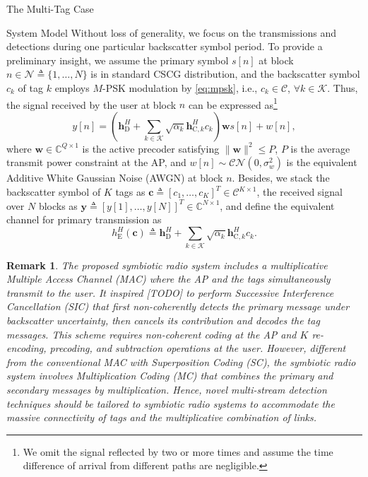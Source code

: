 \documentclass[journal]{IEEEtran}
\newtheorem{remark}{Remark}
\begin{document}
\begin{section}{The Multi-Tag Case}
\begin{subsection}{System Model}
			Without loss of generality, we focus on the transmissions and detections during one particular backscatter symbol period. To provide a preliminary insight, we assume the primary symbol $s[n]$ at block $n \in \mathcal{N} \triangleq \{1,\ldots,N\}$ is in standard CSCG distribution, and the backscatter symbol $c_k$ of tag $k$ employs $M$-PSK modulation by \eqref{eq:mpsk}, i.e., $c_k \in \mathcal{C}$, $\forall k \in \mathcal{K}$. Thus, the signal received by the user at block $n$ can be expressed as\footnote{We omit the signal reflected by two or more times\cite{Wu2019} and assume the time difference of arrival from different paths are negligible\cite{Guo2019b}.}
			\begin{equation}
				y[n] = \left(\boldsymbol{h}_{\mathrm{D}}^H + \sum_{k \in \mathcal{K}} \sqrt{\alpha_k} \boldsymbol{h}_{\mathrm{C},k}^H c_k\right) \boldsymbol{w} s[n] + w[n],
				\label{eq:received_signal}
			\end{equation}
			where $\boldsymbol{w} \in \mathbb{C}^{Q \times 1}$ is the active precoder satisfying $\lVert \boldsymbol{w} \rVert^2 \le P$, $P$ is the average transmit power constraint at the AP, and $w[n] \sim \mathcal{CN}(0,\sigma_w^2)$ is the equivalent Additive White Gaussian Noise (AWGN) at block $n$. Besides, we stack the backscatter symbol of $K$ tags as $\boldsymbol{c} \triangleq [c_1,\ldots,c_K]^T \in \mathcal{C}^{K \times 1}$, the received signal over $N$ blocks as $\boldsymbol{y} \triangleq \left[y[1],\ldots,y[N]\right]^T \in \mathbb{C}^{N \times 1}$, and define the equivalent channel for primary transmission as
			\begin{equation}
				h_{\mathrm{E}}^H(\boldsymbol{c}) \triangleq \boldsymbol{h}_{\mathrm{D}}^H + \sum_{k \in \mathcal{K}} \sqrt{\alpha_k} \boldsymbol{h}_{\mathrm{C},k}^H c_k.
				\label{eq:equivalent_channel}
			\end{equation}

			\begin{remark}
				The proposed symbiotic radio system includes a multiplicative Multiple Access Channel (MAC) where the AP and the tags simultaneously transmit to the user. It inspired [TODO] to perform Successive Interference Cancellation (SIC) that first non-coherently detects the primary message under backscatter uncertainty, then cancels its contribution and decodes the tag messages. This scheme requires non-coherent coding at the AP and $K$ re-encoding, precoding, and subtraction operations at the user. However, different from the conventional MAC with Superposition Coding (SC), the symbiotic radio system involves Multiplication Coding (MC) that combines the primary and secondary messages by multiplication. Hence, novel multi-stream detection techniques should be tailored to symbiotic radio systems to accommodate the massive connectivity of tags and the multiplicative combination of links.
			\end{remark}
		\end{subsection}


\end{section}
\end{document}
